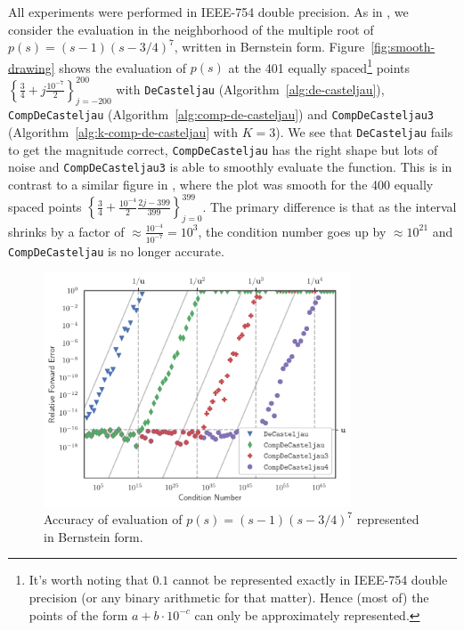 All experiments were performed in IEEE-754 double precision.
As in \cite{Jiang2010}, we consider the evaluation in the neighborhood
of the multiple root of \(p(s) = (s - 1)\left(s - 3/4\right)^7\),
written in Bernstein form.
Figure~\ref{fig:smooth-drawing} shows the evaluation of \(p(s)\) at
the 401 equally spaced\footnote{It's worth noting that \(0.1\) cannot
be represented exactly in IEEE-754 double precision (or any binary
arithmetic for that matter). Hence (most of) the points of the form
\(a + b \cdot 10^{-c}\) can only be approximately represented.} points
\(\left\{\frac{3}{4} + j \frac{10^{-7}}{2}\right\}_{j=-200}^{200}\)
with \texttt{DeCasteljau} (Algorithm~\ref{alg:de-casteljau}),
\texttt{CompDeCasteljau} (Algorithm~\ref{alg:comp-de-casteljau})
and \texttt{CompDeCasteljau3} (Algorithm~\ref{alg:k-comp-de-casteljau}
with \(K = 3\)). We see that \texttt{DeCasteljau} fails to get the
magnitude correct, \texttt{CompDeCasteljau} has the right shape but
lots of noise and \texttt{CompDeCasteljau3} is able to smoothly evaluate
the function. This is in contrast to a similar figure in \cite{Jiang2010},
where the plot was smooth for the 400 equally spaced points
\(\left\{\frac{3}{4} + \frac{10^{-4}}{2} \frac{2j - 399}{399}
\right\}_{j=0}^{399}\). The primary difference is that as the interval
shrinks by a factor of \(\approx \frac{10^{-4}}{10^{-7}} = 10^3\), the
condition number goes up by \(\approx 10^{21}\) and \texttt{CompDeCasteljau}
is no longer accurate.

\begin{figure}
  \includegraphics[width=0.8125\textwidth]{../images/k-compensated/de_casteljau_rel_error.pdf}
  \centering
  \captionsetup{width=.75\linewidth}
  \caption{Accuracy of evaluation of \(p(s) = (s - 1)\left(s - 3/4\right)^7\)
    represented in Bernstein form.}
  \label{fig:compensated-k}
\end{figure}

